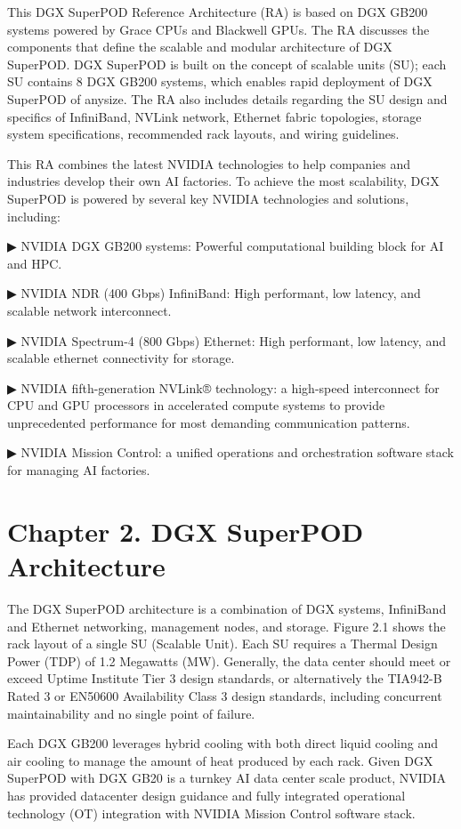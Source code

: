 \documentclass[
  10
]{article}
\begin{document}
This DGX SuperPOD Reference Architecture (RA) is based on DGX GB200
systems powered by Grace CPUs and Blackwell GPUs. The RA discusses the
components that define the scalable and modular architecture of DGX
SuperPOD. DGX SuperPOD is built on the concept of scalable units (SU);
each SU contains 8 DGX GB200 systems, which enables rapid deployment of
DGX SuperPOD of anysize. The RA also includes details regarding the SU
design and specifics of InfiniBand, NVLink network, Ethernet fabric
topologies, storage system specifications, recommended rack layouts, and
wiring guidelines.

This RA combines the latest NVIDIA technologies to help companies and
industries develop their own AI factories. To achieve the most
scalability, DGX SuperPOD is powered by several key NVIDIA technologies
and solutions, including:

▶ NVIDIA DGX GB200 systems: Powerful computational building block for AI
and HPC.

▶ NVIDIA NDR (400 Gbps) InfiniBand: High performant, low latency, and
scalable network interconnect.

▶ NVIDIA Spectrum-4 (800 Gbps) Ethernet: High performant, low latency,
and scalable ethernet connectivity for storage.

▶ NVIDIA fifth-generation NVLink® technology: a high-speed interconnect
for CPU and GPU processors in accelerated compute systems to provide
unprecedented performance for most demanding communication patterns.

▶ NVIDIA Mission Control: a unified operations and orchestration
software stack for managing AI factories.

\section{Chapter 2. DGX SuperPOD
Architecture}\label{chapter-2.-dgx-superpod-architecture}

The DGX SuperPOD architecture is a combination of DGX systems,
InfiniBand and Ethernet networking, management nodes, and storage.
Figure 2.1 shows the rack layout of a single SU (Scalable Unit). Each SU
requires a Thermal Design Power (TDP) of 1.2 Megawatts (MW). Generally,
the data center should meet or exceed Uptime Institute Tier 3 design
standards, or alternatively the TIA942-B Rated 3 or EN50600 Availability
Class 3 design standards, including concurrent maintainability and no
single point of failure.

Each DGX GB200 leverages hybrid cooling with both direct liquid cooling
and air cooling to manage the amount of heat produced by each rack.
Given DGX SuperPOD with DGX GB20 is a turnkey AI data center scale
product, NVIDIA has provided datacenter design guidance and fully
integrated operational technology (OT) integration with NVIDIA Mission
Control software stack.
\end{document}
